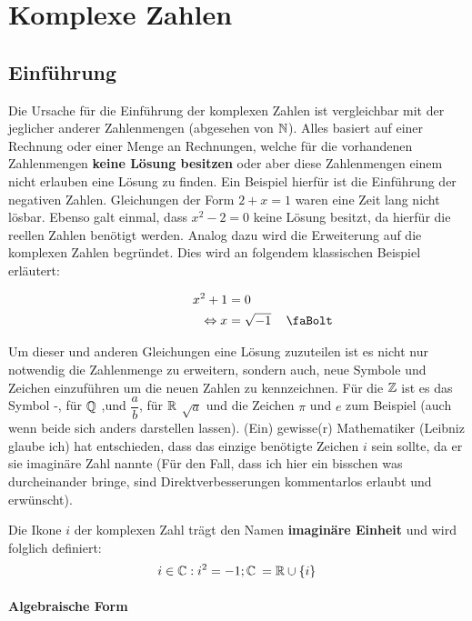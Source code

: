 \documentclass[main.tex]{subfiles}
\begin{document}
\chapter{Komplexe Zahlen}


\section{Einführung}

	Die Ursache für die Einführung der komplexen Zahlen ist vergleichbar mit der jeglicher anderer Zahlenmengen (abgesehen
	von $\mathbb{N}$). Alles basiert auf einer Rechnung oder einer Menge an Rechnungen, welche für die vorhandenen Zahlenmengen \textbf{keine Lösung besitzen} oder aber diese Zahlenmengen einem nicht erlauben eine Lösung zu finden. Ein Beispiel hierfür ist die Einführung der
	negativen Zahlen. Gleichungen der Form $2 + x = 1$ waren eine Zeit lang nicht lösbar. Ebenso galt einmal, dass $x^2 - 2 = 0$ keine
	Lösung besitzt, da hierfür die reellen Zahlen benötigt werden. Analog dazu wird die Erweiterung auf die komplexen Zahlen begründet.
	Dies wird an folgendem klassischen Beispiel erläutert:

	\begin{align*}
		\qquad \qquad x^2 + 1 &= 0 \\
			\Leftrightarrow x &= \sqrt{-1} \quad \text{\lightning}
	\end{align*}

	Um dieser und anderen Gleichungen eine Lösung zuzuteilen ist es nicht nur notwendig die Zahlenmenge zu erweitern, sondern
	auch, neue Symbole und Zeichen einzuführen um die neuen Zahlen zu kennzeichnen. Für die $\mathbb{Z}$ ist es das Symbol \dq-\dq, für $\mathbb{Q}$
	\dq,\dq und $\dfrac{a}{b}$, für $\mathbb{R}$ $\sqrt{a}$ und die Zeichen $\pi$ und $e$ zum Beispiel (auch wenn beide sich anders darstellen lassen). (Ein) gewisse(r) Mathematiker (Leibniz glaube ich) hat entschieden, dass das einzige benötigte Zeichen $i$ sein sollte, da er sie imaginäre Zahl nannte (Für den Fall, dass ich hier ein bisschen was durcheinander bringe, sind Direktverbesserungen kommentarlos erlaubt und erwünscht).

	\begin{Definition}
		Die Ikone $i$ der komplexen Zahl trägt den Namen \textbf{imaginäre Einheit} und wird folglich definiert:
		$$i \in \mathbb{C} : i^2 = -1; \mathbb{C} \:= \mathbb{R} \cup \left \{ i \right \}$$
	\end{Definition}

	\subsubsection{Algebraische Form}
\end{document}

